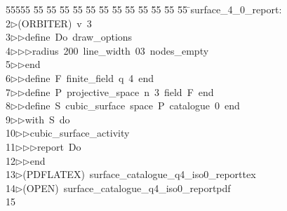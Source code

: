 %
%
\begin{tabbing}
55555 \= 55 \= 55 \= 55 \= 55 \= 55 \= 55 \= 55 \= 55 \= 55 \= 55 \= 55 \= 55 \= \>surface\_4\_0\_report:\\[0pt]
2\>$\triangleright$\>(ORBITER)\ v\ 3\ \\[0pt]
3\>$\triangleright$\>$\triangleright$\>define\ Do\ draw\_options\ \\[0pt]
4\>$\triangleright$\>$\triangleright$\>$\triangleright$\>radius\ 200\ line\_width\ 03\ nodes\_empty\ \\[0pt]
5\>$\triangleright$\>$\triangleright$\>end\ \\[0pt]
6\>$\triangleright$\>$\triangleright$\>define\ F\ finite\_field\ q\ 4\ end\ \\[0pt]
7\>$\triangleright$\>$\triangleright$\>define\ P\ projective\_space\ n\ 3\ field\ F\ end\ \\[0pt]
8\>$\triangleright$\>$\triangleright$\>define\ S\ cubic\_surface\ space\ P\ catalogue\ 0\ end\ \\[0pt]
9\>$\triangleright$\>$\triangleright$\>with\ S\ do\ \\[0pt]
10\>$\triangleright$\>$\triangleright$\>cubic\_surface\_activity\ \\[0pt]
11\>$\triangleright$\>$\triangleright$\>$\triangleright$\>report\ Do\ \\[0pt]
12\>$\triangleright$\>$\triangleright$\>end\\[0pt]
13\>$\triangleright$\>(PDFLATEX)\ surface\_catalogue\_q4\_iso0\_reporttex\\[0pt]
14\>$\triangleright$\>(OPEN)\ surface\_catalogue\_q4\_iso0\_reportpdf\\[0pt]
15\>\end{tabbing}
